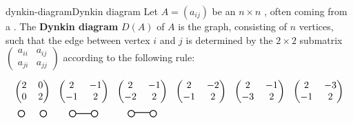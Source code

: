 \begin{topic}{dynkin-diagram}{Dynkin diagram}
    Let $A = (a_{ij})$ be an $n \times n$ , often coming from a . The \textbf{Dynkin diagram} $D(A)$ of $A$ is the graph, consisting of $n$ vertices, such that the edge between vertex $i$ and $j$ is determined by the $2 \times 2$ submatrix $\begin{pmatrix} a_{ii} & a_{ij} \\ a_{ji} & a_{jj} \end{pmatrix}$ according to the following rule:
    \[ \svg \setlength{\arraycolsep}{3pt} \begin{tikzcd}[column sep=0em, row sep=0em]
        \begin{pmatrix} 2 & 0 \\ 0 & 2 \end{pmatrix} & \begin{pmatrix} 2 & -1 \\ -1 & 2 \end{pmatrix} & \begin{pmatrix} 2 & -1 \\ -2 & 2 \end{pmatrix} & \begin{pmatrix} 2 & -2 \\ -1 & 2 \end{pmatrix} & \begin{pmatrix} 2 & -1 \\ -3 & 2 \end{pmatrix} & \begin{pmatrix} 2 & -3 \\ -1 & 2 \end{pmatrix} \\
            \begin{tikzpicture}[scale=.4]
                \draw[thick] (0cm,0) circle (.3cm);
                \draw[thick] (2cm,0) circle (.3cm);
            \end{tikzpicture} & \begin{tikzpicture}[scale=.4]
                \draw[thick] (0cm,0) circle (.3cm);
                \draw[thick] (2cm,0) circle (.3cm);
                \draw[thick] (0.3cm,0) -- +(1.4 cm,0);
            \end{tikzpicture} & \begin{tikzpicture}[scale=.4]
                \draw[thick] (0cm,0) circle (.3cm);
                \draw[thick] (2cm,0) circle (.3cm);
                \draw[thick] (0.3cm,0.1cm) -- +(1.4 cm,0cm);

\end{tikzpicture}
\end{tikzcd}\]
\end{topic}
